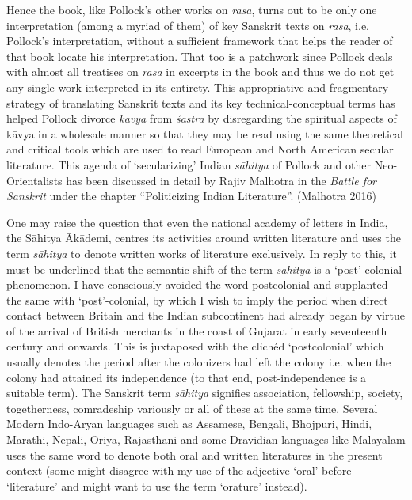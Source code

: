 Hence the book, like Pollock’s other works on \textsl{rasa}, turns out to be only one interpretation (among a myriad of them) of key Sanskrit texts on \textsl{rasa}, i.e. Pollock’s interpretation, without a sufficient framework that helps the reader of that book locate his interpretation. That too is a patchwork since Pollock deals with almost all treatises on \textsl{rasa} in excerpts in the book and thus we do not get any single work interpreted in its entirety. This appropriative and fragmentary strategy of translating Sanskrit texts and its key technical-conceptual terms has helped Pollock divorce \textsl{kāvya} from \textsl{śāstra} by disregarding the spiritual aspects of kāvya in a wholesale manner so that they may be read using the same theoretical and critical tools which are used to read European and North American secular literature. This agenda of ‘secularizing’ Indian \textsl{sāhitya} of Pollock and other Neo-Orientalists has been discussed in detail by Rajiv Malhotra in the \textsl{Battle for Sanskrit} under the chapter “Politicizing Indian Literature”. (Malhotra 2016) 

One may raise the question that even the national academy of letters in India, the Sāhitya Ākādemi, centres its activities around written literature and uses the term \textsl{sāhitya} to denote written works of literature exclusively. In reply to this, it must be underlined that the semantic shift of the term \textsl{sāhitya} is a ‘post’-colonial phenomenon. I have consciously avoided the word postcolonial and supplanted the same with ‘post’-colonial, by which I wish to imply the period when direct contact between Britain and the Indian subcontinent had already began by virtue of the arrival of British merchants in the coast of Gujarat in early seventeenth century and onwards. This is juxtaposed with the clichéd ‘postcolonial’ which usually denotes the period after the colonizers had left the colony i.e. when the colony had attained its independence (to that end, post-independence is a suitable term). The Sanskrit term \textsl{sāhitya} signifies association, fellowship, society, togetherness, comradeship variously or all of these at the same time. Several Modern Indo-Aryan languages such as Assamese, Bengali, Bhojpuri, Hindi, Marathi, Nepali, Oriya, Rajasthani and some Dravidian languages like Malayalam uses the same word to denote both oral and written literatures in the present context (some might disagree with my use of the adjective ‘oral’ before ‘literature’ and might want to use the term ‘orature’ instead).\\[-21pt]

